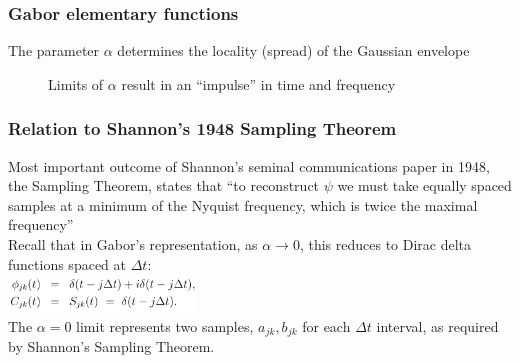 \documentclass{beamer}
\begin{document}

\begin{frame}
	\frametitle{Gabor elementary functions}
	The parameter $\alpha$ determines the locality (spread) of the Gaussian envelope
	\begin{figure}
		\centering
		\hspace{0.2em}
		\caption{Limits of $\alpha$ result in an ``impulse'' in time and frequency}
	\end{figure}
\end{frame}

\begin{frame}
	\frametitle{Relation to Shannon's 1948 Sampling Theorem}
	Most important outcome of Shannon's seminal communications paper in 1948, the Sampling Theorem, states that ``to reconstruct $\psi$ we must take equally spaced samples at a minimum of the Nyquist frequency, which is twice the maximal frequency''\\
	Recall that in Gabor's representation, as $\alpha \rightarrow 0$, this reduces to Dirac delta functions spaced at $\Delta t$:\\
	\includegraphics[width=5cm]{./gaboralt4.png}\\
	The $\alpha = 0$ limit represents two samples, $a_{jk}, b_{jk}$ for each $\Delta t$ interval, as required by Shannon's Sampling Theorem.
\end{frame}
\end{document}
